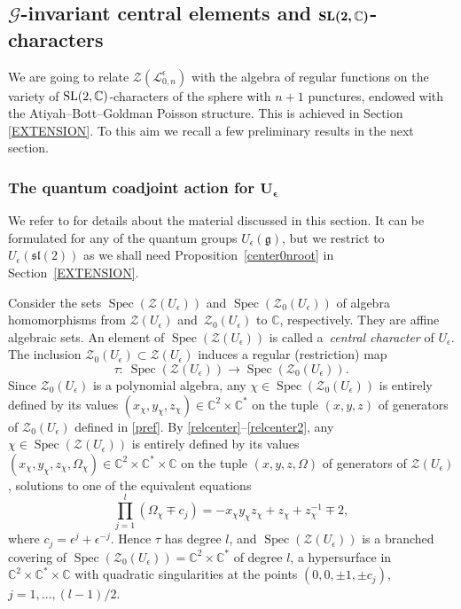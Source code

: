 \documentclass[pdftex]{sigma}%
\numberwithin{equation}{section}
\numberwithin{figure}{section}
\newcommand{\Ue}{U_\epsilon}
\newcommand{\e}{\epsilon}
\newcommand{\mc}{\mathbb{C}}
\newcommand{\Gg}{{\mathcal G}}
\newcommand{\Ll}{{\mathcal L}}
\newcommand{\lra}{\longrightarrow}
\begin{document}
\subsection[Gg-invariant central elements and SL(2,C)-characters]
{$\boldsymbol{\Gg}$-invariant central elements and $\boldsymbol{{\rm SL}(2,\mc)}$-characters}\label{QCAL0nsec}
We are going to relate $\mathcal{Z}(\Ll_{0,n}^\e)$ with the algebra of regular functions on the variety of ${\rm SL}(2,\mc)$-characters of the sphere with $n+1$ punctures, endowed with the Atiyah--Bott--Goldman Poisson structure. This is achieved in Section \ref{EXTENSION}. To this aim we recall a few preliminary results in the next section.

\subsubsection[The quantum coadjoint action for U\_e]{The quantum coadjoint action for $\boldsymbol{U_\e}$}
We refer to \cite{DC-K,DC-K-P1,DC-K-P2} for details about the material discussed in this section. It can be formulated for any of the quantum groups $U_\e(\mathfrak{g})$, but we restrict to $U_\e({\mathfrak{sl}}(2))$ as we shall need Proposition~\ref{center0nroot} in Section~\ref{EXTENSION}.

Consider the sets $\operatorname{Spec}(\mathcal{Z}(U_\epsilon))$ and $\operatorname{Spec}(\mathcal{Z}_0(U_\epsilon))$ of algebra homomorphisms from $\mathcal{Z}(U_\epsilon)$ and~$\mathcal{Z}_0(U_\epsilon)$ to $\mc$, respectively. They are affine algebraic sets. An element of $\operatorname{Spec}(\mathcal{Z}(U_\epsilon))$ is called a~\textit{central character} of $\Ue$. The inclusion $\mathcal{Z}_0(U_\epsilon)\subset \mathcal{Z}(U_\epsilon)$ induces a regular (restriction) map\vspace{-1ex}
\begin{equation}\label{tau}
\tau\colon\ \operatorname{Spec}(\mathcal{Z}(U_\epsilon)) \lra \operatorname{Spec}(\mathcal{Z}_0(U_\epsilon)).
\end{equation}
Since $\mathcal{Z}_0(U_\epsilon)$ is a polynomial algebra, any $\chi\in \operatorname{Spec}(\mathcal{Z}_0(U_\epsilon))$ is entirely defined by its values $(x_\chi,y_\chi,z_\chi)\in \mc^2\times\mc^*$ on the tuple $(x,y,z)$ of generators of $\mathcal{Z}_0(U_\epsilon)$ defined in \eqref{pref}. By \eqref{relcenter}--\eqref{relcenter2}, any $\chi\in \operatorname{Spec}(\mathcal{Z}(U_\epsilon))$ is entirely defined by its values $(x_\chi,y_\chi,z_\chi,\Omega_\chi)\in \mc^2\times\mc^*\times\mc$ on the tuple $(x,y,z,\Omega)$ of generators of $\mathcal{Z}(U_\epsilon)$, solutions to one of the equivalent equations\vspace{-1ex}
\[
\prod_{j=1}^l (\Omega_\chi\mp c_j) = -x_\chi y_\chi z_\chi+z_\chi+z_\chi^{-1}\mp 2,
\]
where $c_j = \e^{j}+\e^{-j}$. Hence $\tau$ has degree $l$, and $\operatorname{Spec}(\mathcal{Z}(U_\epsilon))$ is a branched covering of $\operatorname{Spec}(\mathcal{Z}_0(U_\epsilon)) = \mc^2\times \mc^*$ of degree $l$, a hypersurface in $\mc^2\times\mc^*\times\mc$ with quadratic singularities at the points $(0,0,\pm 1,\pm c_j)$, $j=1,\dots,(l-1)/2$.
\end{document}
